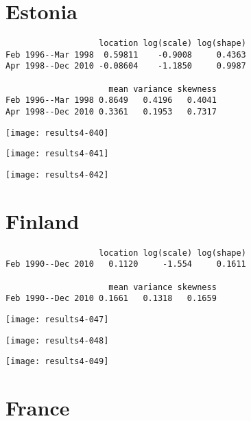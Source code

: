 \documentclass[a4paper]{article}
\begin{document}
\section*{Estonia}


\begin{verbatim}
                   location log(scale) log(shape)
Feb 1996--Mar 1998  0.59811    -0.9008     0.4363
Apr 1998--Dec 2010 -0.08604    -1.1850     0.9987

                     mean variance skewness
Feb 1996--Mar 1998 0.8649   0.4196   0.4041
Apr 1998--Dec 2010 0.3361   0.1953   0.7317

\end{verbatim}

\begin{center}
\texttt{[image: results4-040]}

\texttt{[image: results4-041]}

\texttt{[image: results4-042]}
\end{center}


\newpage

\section*{Finland}


\begin{verbatim}
                   location log(scale) log(shape)
Feb 1990--Dec 2010   0.1120     -1.554     0.1611

                     mean variance skewness
Feb 1990--Dec 2010 0.1661   0.1318   0.1659

\end{verbatim}

\begin{center}
\texttt{[image: results4-047]}

\texttt{[image: results4-048]}

\texttt{[image: results4-049]}
\end{center}


\newpage

\section*{France}
\end{document}
